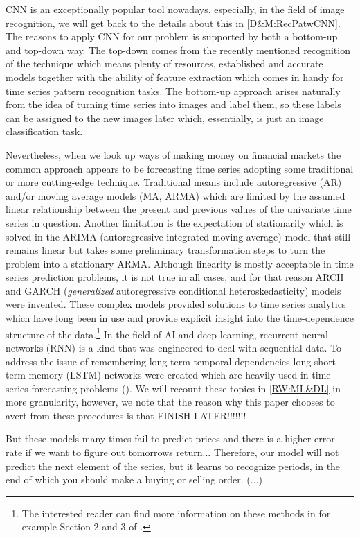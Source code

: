\documentclass[11pt, a4paper]{article}
\begin{document}
CNN is an exceptionally popular tool nowadays, especially, in the field of image recognition, we will get back to the details about this in \ref{D&M:RecPatwCNN}.
The reasons to apply CNN for our problem is supported by both a bottom-up and top-down way. The top-down comes from the recently mentioned recognition of the technique which 
means plenty of resources, established and accurate models together with the ability of feature extraction which comes in handy for time series pattern recognition tasks. 
The bottom-up approach arises naturally from the idea of turning time series into images and label them, so these labels can be assigned to the new images later which, essentially, is 
just an image classification task. 

Nevertheless, when we look up ways of making money on financial markets the common approach appears to be forecasting time series adopting some traditional or more cutting-edge technique. 
Traditional means include autoregressive (AR) and/or moving average models (MA, ARMA) which are limited by the assumed linear relationship between the present and previous values of the univariate time series in question. 
Another limitation is the expectation of stationarity which is solved in the ARIMA (autoregressive integrated moving average) model that still remains linear but takes some preliminary transformation steps 
to turn the problem into a stationary ARMA. Although linearity is mostly acceptable in time series prediction problems, it is not true in all cases, and for that reason  
ARCH and GARCH (\textit{generalized} autoregressive conditional heteroskedasticity) models were invented. These complex models provided solutions to time series analytics which have long been in 
use and provide explicit insight into the time-dependence structure of the data.\footnote{The interested reader can find more information on these methods in for example Section 2 and 3 of \cite{tsay2005analysis}.}
In the field of AI and deep learning, recurrent neural networks (RNN) is a kind that was engineered to deal with sequential data. To address the issue of remembering long term temporal dependencies long 
short term memory (LSTM) networks were created which are heavily used in time series forecasting problems (\cite{Hochr97LSTM}). We will recount these topics in \ref{RW:ML&DL} in more granularity, 
however, we note that the reason why this paper chooses to avert from these procedures is that FINISH LATER!!!!!!!

But these models many times fail to predict prices and there is a higher error rate if we want to figure out tomorrows return... 
Therefore, our model will not predict the next element of the series, but it learns to recognize periods, in the end of which you should make a buying or selling order. (...)
\end{document}
